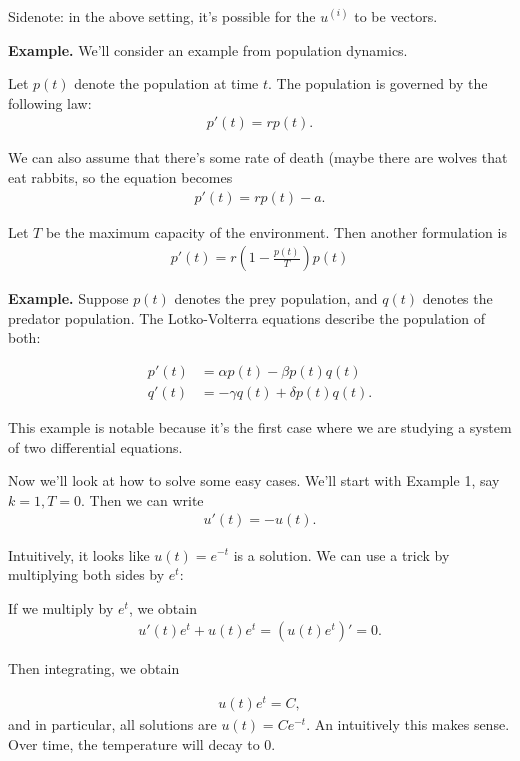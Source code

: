 \documentclass{article}
\begin{document}
Sidenote: in the above setting, it's possible for the $u^{(i)}$ to be vectors.

{\bf Example.}  We'll consider an example from population dynamics.

Let $p(t)$ denote the population at time $t$.  The population is governed by the following law:
\begin{align*}
  p'(t) = r p(t).
\end{align*}

We can also assume that there's some rate of death (maybe there are wolves that eat rabbits, so the equation becomes
  \begin{align*}
    p'(t) = rp(t) - a.
  \end{align*}

  Let $T$ be the maximum capacity of the environment.  Then another formulation is
\begin{align*}
  p'(t) = r \left( 1 - \frac{p(t)}{T} \right)p(t)
\end{align*}

{\bf Example.} Suppose $p(t)$ denotes the prey population, and $q(t)$ denotes the predator population.  The Lotko-Volterra equations describe the population of both:

\begin{align*}
  p'(t) &= \alpha p(t) - \beta p(t) q(t) \\
  q'(t) &= -\gamma q(t) + \delta p(t) q(t).
\end{align*}

This example is notable because it's the first case where we are studying a system of two differential equations.

Now we'll look at how to solve some easy cases.  We'll start with Example 1, say $k = 1, T = 0$.  Then we can write
\begin{align*}
  u'(t) = - u(t).
\end{align*}

Intuitively, it looks like $u(t) = e^{-t}$ is a solution.  We can use a trick by multiplying both sides by $e^t$:

If we multiply by $e^t$, we obtain
\begin{align*}
  u'(t) e^t + u(t) e^t = (u(t) e^t)' = 0.
\end{align*}

Then integrating, we obtain  

\begin{align*}
  u(t) e^t = C,
\end{align*}
and in particular, all solutions are $u(t) = C e^{-t} $. An intuitively this makes sense.  Over time, the temperature will decay to 0.
\end{document}
